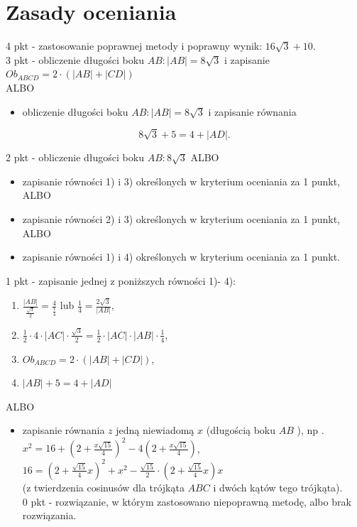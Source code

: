 \documentclass[10pt]{article}
\begin{document}
\section*{Zasady oceniania}
4 pkt - zastosowanie poprawnej metody i poprawny wynik: $16 \sqrt{3}+10$.\\
3 pkt - obliczenie długości boku $A B:|A B|=8 \sqrt{3}$ i zapisanie $O b_{A B C D}=2 \cdot(|A B|+|C D|)$\\
ALBO

\begin{itemize}
  \item obliczenie długości boku $A B:|A B|=8 \sqrt{3}$ i zapisanie równania
\end{itemize}

$$
8 \sqrt{3}+5=4+|A D| .
$$

2 pkt - obliczenie długości boku $A B: 8 \sqrt{3}$ ALBO

\begin{itemize}
  \item zapisanie równości 1) i 3) określonych w kryterium oceniania za 1 punkt, ALBO
  \item zapisanie równości 2) i 3) określonych w kryterium oceniania za 1 punkt, ALBO
  \item zapisanie równości 1) i 4) określonych w kryterium oceniania za 1 punkt.
\end{itemize}

1 pkt - zapisanie jednej z poniższych równości 1)- 4):

\begin{enumerate}
  \item $\frac{|A B|}{\frac{\sqrt{3}}{2}}=\frac{4}{\frac{1}{4}}$ lub $\frac{1}{4}=\frac{2 \sqrt{3}}{|A B|}$,
  \item $\frac{1}{2} \cdot 4 \cdot|A C| \cdot \frac{\sqrt{3}}{2}=\frac{1}{2} \cdot|A C| \cdot|A B| \cdot \frac{1}{4}$,
  \item $O b_{A B C D}=2 \cdot(|A B|+|C D|)$,
  \item $|A B|+5=4+|A D|$
\end{enumerate}

ALBO

\begin{itemize}
  \item zapisanie równania $z$ jedną niewiadomą $x$ (długością boku $A B$ ), np .\\
$x^{2}=16+\left(2+\frac{x \sqrt{15}}{4}\right)^{2}-4\left(2+\frac{x \sqrt{15}}{4}\right)$,\\
$16=\left(2+\frac{\sqrt{15}}{4} x\right)^{2}+x^{2}-\frac{\sqrt{15}}{2} \cdot\left(2+\frac{\sqrt{15}}{4} x\right) x$\\
(z twierdzenia cosinusów dla trójkąta $A B C$ i dwóch kątów tego trójkąta).\\
0 pkt - rozwiązanie, w którym zastosowano niepoprawną metodę, albo brak rozwiązania.
\end{itemize}
\end{document}
